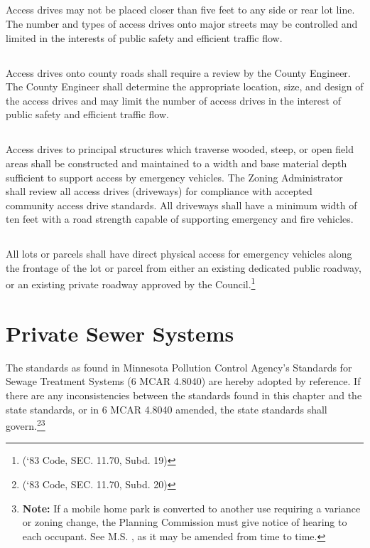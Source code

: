 \subsection{}
Access drives may not be placed closer than five feet to any side or rear lot line.  The number and types of access drives onto major streets may be controlled and limited in the interests of public safety and efficient traffic flow.
\subsection{}
Access drives onto county roads shall require a review by the County Engineer.  The County Engineer shall determine the appropriate location, size, and design of the access drives and may limit the number of access drives in the interest of public safety and efficient traffic flow.
\subsection{}
Access drives to principal structures which traverse wooded, steep, or open field areas shall be constructed and maintained to a width and base material depth sufficient to support access by emergency vehicles. The Zoning Administrator shall review all access drives (driveways) for compliance with accepted community access drive standards. All driveways shall have a minimum width of ten feet with a road strength capable of supporting emergency and fire vehicles.
\subsection{}
All lots or parcels shall have direct physical access for emergency vehicles along the frontage of the lot or parcel from either an existing dedicated public roadway, or an existing private roadway approved by the Council.\footnote{(‘83 Code, SEC. 11.70, Subd. 19)}

\section{Private Sewer Systems}
The standards as found in Minnesota Pollution Control Agency’s Standards for Sewage Treatment Systems (6 MCAR 4.8040) are hereby adopted by reference. If there are any inconsistencies between the standards found in this chapter and the state standards, or in 6 MCAR 4.8040 amended, the state standards shall govern.\footnote{(‘83 Code, SEC. 11.70, Subd. 20)}\footnote{\textbf{Note:} If a mobile home park is converted to another use requiring a variance or zoning change, the Planning Commission must give notice of hearing to each occupant. See M.S. , as it may be amended from time to time.}\\


